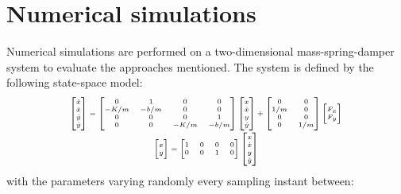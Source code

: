 \documentclass[letterpaper, 10 pt, conference]{ieeeconf}  %
\begin{document}
    \fi
\section{Numerical simulations}
Numerical simulations are performed on a two-dimensional mass-spring-damper system to evaluate the approaches mentioned. The system is defined by the following state-space model:
\begin{equation}
\tiny
\begin{matrix}
\begin{bmatrix}
\dot{x} \\ \ddot{x} \\ \dot{y} \\ \ddot{y} 
\end{bmatrix} = 
\begin{bmatrix}
0 & 1 & 0 & 0 \\
-K/m & -b/m & 0 & 0 \\
0 & 0 & 0 & 1 \\
0 & 0 & -K/m & -b/m
\end{bmatrix}
\begin{bmatrix}
x \\ \dot{x} \\ y \\ \dot{y} 
\end{bmatrix} + 
\begin{bmatrix}
0 & 0\\
1/m & 0 \\
0 & 0 \\
0 & 1/m
\end{bmatrix}
\begin{bmatrix}
F_x \\ F_y
\end{bmatrix}  
\vspace{2pt} 
\\
\begin{bmatrix}
x \\ y 
\end{bmatrix} =
\begin{bmatrix}
1 & 0 & 0 & 0\\
0 & 0 & 1 & 0
\end{bmatrix}
\begin{bmatrix}
x \\ \dot{x} \\ y \\ \dot{y} 
\end{bmatrix}
\end{matrix}
\end{equation}
with the parameters varying randomly every sampling instant between:
\end{document}
